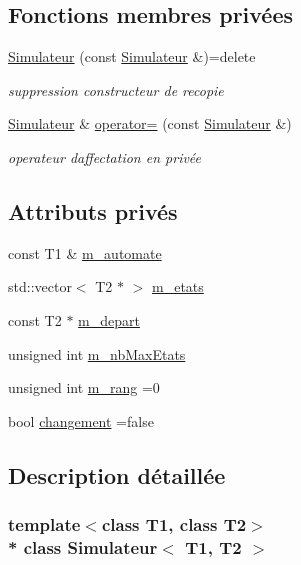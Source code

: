 \subsection*{Fonctions membres privées}
\begin{DoxyCompactItemize}
\item 
\hyperlink{class_simulateur_a4d31da226a22b706e9f67311b517dad8}{Simulateur} (const \hyperlink{class_simulateur}{Simulateur} \&)=delete
\begin{DoxyCompactList}\small\item\em suppression constructeur de recopie \end{DoxyCompactList}\item 
\hyperlink{class_simulateur}{Simulateur} \& \hyperlink{class_simulateur_a60d23b4aa969fb25147147875fccafbb}{operator=} (const \hyperlink{class_simulateur}{Simulateur} \&)
\begin{DoxyCompactList}\small\item\em operateur d\textquotesingle{}affectation en privée \end{DoxyCompactList}\end{DoxyCompactItemize}
\subsection*{Attributs privés}
\begin{DoxyCompactItemize}
\item 
const T1 \& \hyperlink{class_simulateur_a90182aefba76d1a43060fe608d493398}{m\+\_\+automate}
\item 
std\+::vector$<$ T2 $\ast$ $>$ \hyperlink{class_simulateur_a9156b165b5affe1b4627ff66802cfc99}{m\+\_\+etats}
\item 
const T2 $\ast$ \hyperlink{class_simulateur_a8f024dcb44d5688aac1fdbc7df531104}{m\+\_\+depart}
\item 
unsigned int \hyperlink{class_simulateur_aee6fbe615a412a23aafe23d5b6487eec}{m\+\_\+nb\+Max\+Etats}
\item 
unsigned int \hyperlink{class_simulateur_a40f39f55c107779de9c1b4418b98f7c0}{m\+\_\+rang} =0
\item 
bool \hyperlink{class_simulateur_aa734d94931986b1a7a8351a94dde1938}{changement} =false
\end{DoxyCompactItemize}


\subsection{Description détaillée}
\subsubsection*{template$<$class T1, class T2$>$\\*
class Simulateur$<$ T1, T2 $>$}

